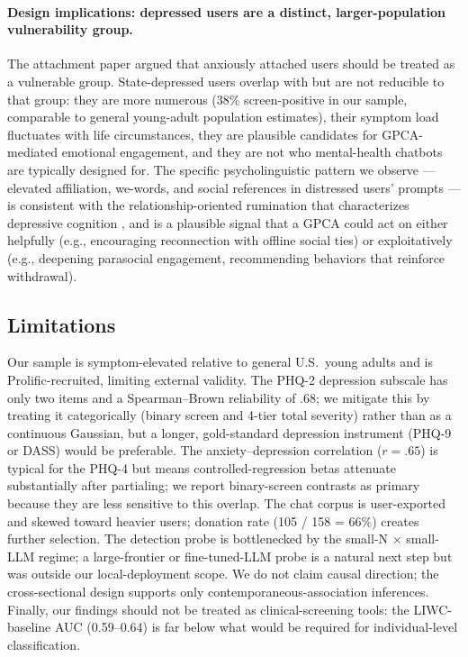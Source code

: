 \documentclass[letterpaper]{article}
\begin{document}
\paragraph{Design implications: depressed users are a distinct, larger-population vulnerability group.} The attachment paper argued that anxiously attached users should be treated as a vulnerable group. State-depressed users overlap with but are not reducible to that group: they are more numerous (38\% screen-positive in our sample, comparable to general young-adult population estimates), their symptom load fluctuates with life circumstances, they are plausible candidates for GPCA-mediated emotional engagement, and they are not who mental-health chatbots are typically designed for. The specific psycholinguistic pattern we observe --- elevated affiliation, we-words, and social references in distressed users' prompts --- is consistent with the relationship-oriented rumination that characterizes depressive cognition \citep{nolenhoeksema2008rumination}, and is a plausible signal that a GPCA could act on either helpfully (e.g., encouraging reconnection with offline social ties) or exploitatively (e.g., deepening parasocial engagement, recommending behaviors that reinforce withdrawal).

\subsection{Limitations}

Our sample is symptom-elevated relative to general U.S.\ young adults and is Prolific-recruited, limiting external validity. The PHQ-2 depression subscale has only two items and a Spearman--Brown reliability of .68; we mitigate this by treating it categorically (binary screen and 4-tier total severity) rather than as a continuous Gaussian, but a longer, gold-standard depression instrument (PHQ-9 or DASS) would be preferable. The anxiety--depression correlation ($r=.65$) is typical for the PHQ-4 but means controlled-regression betas attenuate substantially after partialing; we report binary-screen contrasts as primary because they are less sensitive to this overlap. The chat corpus is user-exported and skewed toward heavier users; donation rate (105 / 158 = 66\%) creates further selection. The detection probe is bottlenecked by the small-N $\times$ small-LLM regime; a large-frontier or fine-tuned-LLM probe is a natural next step but was outside our local-deployment scope. We do not claim causal direction; the cross-sectional design supports only contemporaneous-association inferences. Finally, our findings should not be treated as clinical-screening tools: the LIWC-baseline AUC (0.59--0.64) is far below what would be required for individual-level classification.
\end{document}
